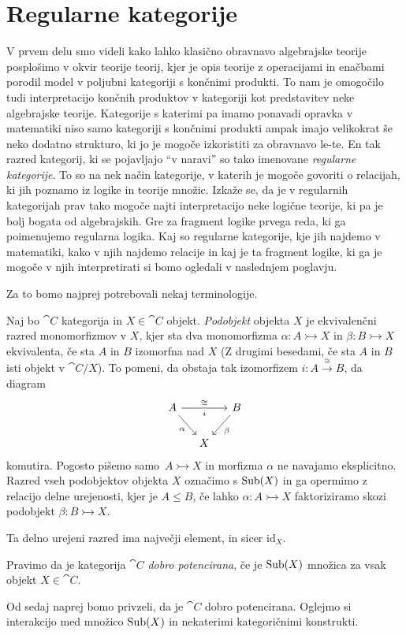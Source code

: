 \documentclass[../kategoricna_logika.tex]{subfiles}
\begin{document}
\section{Regularne kategorije}
V prvem delu smo videli kako lahko klasično obravnavo algebrajske
teorije posplošimo v okvir teorije teorij, kjer je opis teorije
z operacijami in enačbami porodil model v poljubni kategoriji
s končnimi produkti. To nam je omogočilo tudi interpretacijo
končnih produktov v kategoriji kot predstavitev neke algebrajske
teorije. Kategorije s katerimi pa imamo ponavadi opravka v
matematiki niso samo kategoriji s končnimi produkti ampak
imajo velikokrat še neko dodatno strukturo, ki jo je
mogoče izkoristiti za obravnavo le-te. En tak razred kategorij,
ki se pojavljajo ``v naravi'' so tako imenovane \emph{regularne kategorije}.
To so na nek način kategorije, v katerih je mogoče govoriti o
relacijah, ki jih poznamo iz logike in teorije množic.
Izkaže se, da je v regularnih kategorijah prav tako mogoče
najti interpretacijo neke logične teorije, ki pa je bolj
bogata od algebrajskih. Gre za fragment logike prvega reda,
ki ga poimenujemo regularna logika.
Kaj so regularne kategorije, kje jih najdemo v matematiki,
kako v njih najdemo relacije in kaj je ta fragment logike,
ki ga je mogoče v njih interpretirati si bomo ogledali v
naslednjem poglavju.

Za to bomo najprej potrebovali nekaj terminologije.
\begin{definicija}
 Naj bo $\cat{C}$ kategorija in $X \in \cat{C}$ objekt.
 \emph{Podobjekt} objekta $X$ je ekvivalenčni razred monomorfizmov v $X$,
 kjer sta dva monomorfizma $\alpha: A \rightarrowtail X$ in $\beta : B \rightarrowtail X$
 ekvivalenta, če sta $A$ in $B$ izomorfna nad $X$
 (Z drugimi besedami, če sta $A$ in $B$ isti objekt v $\cat{C}/X$).
 To pomeni, da obstaja tak izomorfizem $i : A \xrightarrow{\cong} B$, da diagram
 \begin{equation*}
   \begin{tikzcd}[column sep=small]
     A \ar[rr, "i"']{a}{\cong} \ar[dr, "\alpha"'] & & B \ar[dl, "\beta"] \\
     & X &
   \end{tikzcd}
 \end{equation*}
 komutira. Pogosto pišemo samo~${A \rightarrowtail X}$ in morfizma $\alpha$ ne navajamo eksplicitno.
 Razred vseh podobjektov objekta $X$ označimo s $\operatorname{Sub}(X)$ in ga opermimo z relacijo delne urejenosti,
 kjer je $A \leq B$, če lahko $\alpha : A \rightarrowtail X$ faktoriziramo skozi podobjekt 
 $\beta : B \rightarrowtail X$.
\end{definicija}
Ta delno urejeni razred ima največji element, in sicer $\mathrm{id}_X$.
\begin{definicija}
  Pravimo da je kategorija $\cat{C}$ \emph{dobro potencirana},
  če je $\operatorname{Sub}(X)$ množica za vsak objekt $X \in \cat{C}$.
\end{definicija}
Od sedaj naprej bomo privzeli, da je $\cat{C}$ dobro potencirana.
Oglejmo si interakcijo med množico $\operatorname{Sub}(X)$ in nekaterimi kategoričnimi konstrukti.
\end{document}
